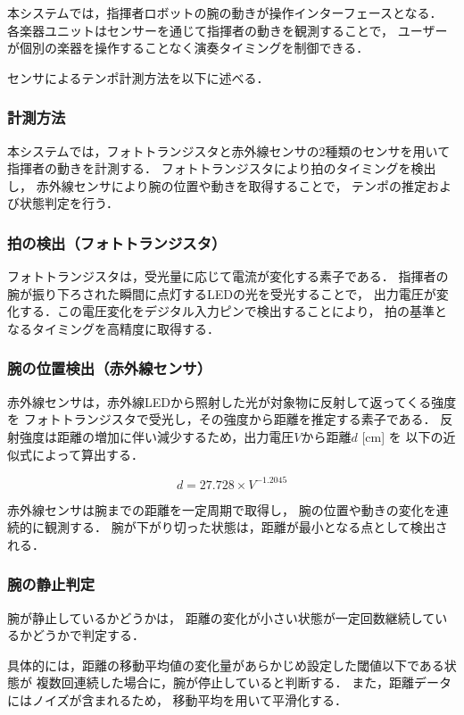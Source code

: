 \documentclass[lualatex,book,paper=a4paper,jafontsize=11.5pt,jafontscale=1.05,oneside]{jlreq}
\begin{document}
本システムでは，指揮者ロボットの腕の動きが操作インターフェースとなる．
各楽器ユニットはセンサーを通じて指揮者の動きを観測することで，
ユーザーが個別の楽器を操作することなく演奏タイミングを制御できる．

センサによるテンポ計測方法を以下に述べる．

\subsubsection*{計測方法}
本システムでは，フォトトランジスタと赤外線センサの2種類のセンサを用いて
指揮者の動きを計測する．
フォトトランジスタにより拍のタイミングを検出し，
赤外線センサにより腕の位置や動きを取得することで，
テンポの推定および状態判定を行う．

\subsubsection*{拍の検出（フォトトランジスタ）}
フォトトランジスタは，受光量に応じて電流が変化する素子である．
指揮者の腕が振り下ろされた瞬間に点灯するLEDの光を受光することで，
出力電圧が変化する．この電圧変化をデジタル入力ピンで検出することにより，
拍の基準となるタイミングを高精度に取得する．

\subsubsection*{腕の位置検出（赤外線センサ）}
赤外線センサは，赤外線LEDから照射した光が対象物に反射して返ってくる強度を
フォトトランジスタで受光し，その強度から距離を推定する素子である．
反射強度は距離の増加に伴い減少するため，出力電圧$V$から距離$d$ [cm] を
以下の近似式によって算出する．

\begin{equation}
  d = 27.728 \times V^{-1.2045}
\end{equation}

赤外線センサは腕までの距離を一定周期で取得し，
腕の位置や動きの変化を連続的に観測する．
腕が下がり切った状態は，距離が最小となる点として検出される．

\subsubsection*{腕の静止判定}
腕が静止しているかどうかは，
距離の変化が小さい状態が一定回数継続しているかどうかで判定する．

具体的には，距離の移動平均値の変化量があらかじめ設定した閾値以下である状態が
複数回連続した場合に，腕が停止していると判断する．
また，距離データにはノイズが含まれるため，
移動平均を用いて平滑化する．
\end{document}
